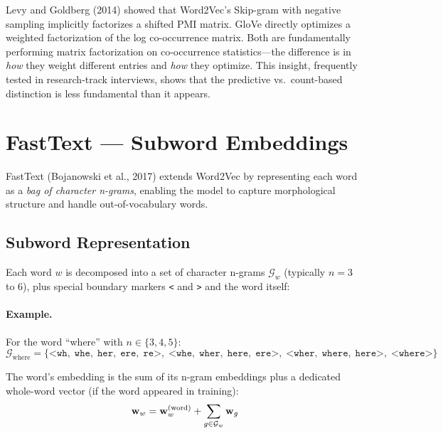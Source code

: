 \begin{keyinsight}
Levy and Goldberg (2014) showed that Word2Vec's Skip-gram with negative
sampling implicitly factorizes a shifted PMI matrix.  GloVe directly optimizes
a weighted factorization of the log co-occurrence matrix.  Both are
fundamentally performing matrix factorization on co-occurrence statistics---the
difference is in \emph{how} they weight different entries and \emph{how} they
optimize.  This insight, frequently tested in research-track interviews,
shows that the predictive vs.\ count-based distinction is less fundamental
than it appears.
\end{keyinsight}


\section{FastText --- Subword Embeddings}
\label{sec:fasttext}

FastText (Bojanowski et al., 2017) extends Word2Vec by representing each word
as a \emph{bag of character n-grams}, enabling the model to capture
morphological structure and handle out-of-vocabulary words.

\subsection{Subword Representation}

Each word $w$ is decomposed into a set of character n-grams $\mathcal{G}_w$
(typically $n = 3$ to $6$), plus special boundary markers \texttt{<} and
\texttt{>} and the word itself:

\paragraph{Example.}
For the word ``where'' with $n \in \{3, 4, 5\}$:
\[
    \mathcal{G}_{\text{where}} = \{\texttt{<wh},\; \texttt{whe},\;
    \texttt{her},\; \texttt{ere},\; \texttt{re>},\; \texttt{<whe},\;
    \texttt{wher},\; \texttt{here},\; \texttt{ere>},\; \texttt{<wher},\;
    \texttt{where},\; \texttt{here>},\; \texttt{<where>}\}
\]

The word's embedding is the sum of its n-gram embeddings plus a dedicated
whole-word vector (if the word appeared in training):
\[
    \mathbf{w}_w = \mathbf{w}_w^{(\text{word})} + \sum_{g \in \mathcal{G}_w} \mathbf{w}_g
\]

